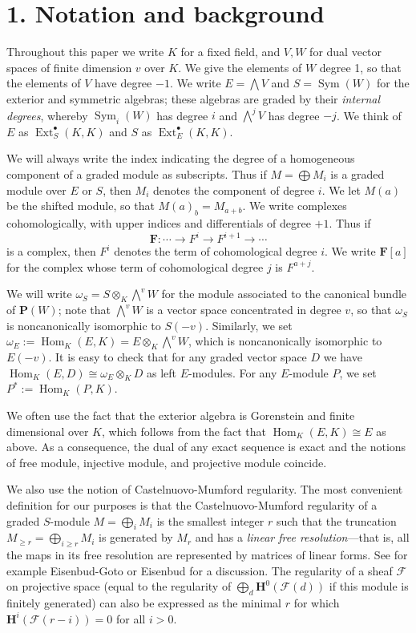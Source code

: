 \documentclass{tran-l}
\newcommand{\iso}{\cong}
\newcommand{\myHom}{\operatorname{Hom}}
\newcommand{\Ext}{{\operatorname{Ext}}}
\newcommand{\Sym}{\operatorname{Sym}}
\newcommand{\F}{\mathcal{F}}
\newcommand{\FF}{\mathbf{F}}
\newcommand{\myH}{\mathbf{H}}
\newcommand{\myP}{\mathbf{P}}
\theoremstyle{plain}
\theoremstyle{remark}
\theoremstyle{definition}
\begin{document}
\section*{1. Notation and background}

Throughout this paper we write $K$ for a fixed field, and $V, W$ for
dual vector spaces of finite dimension $v$ over $K$.  We give the
elements of $W$ degree 1, so that the elements of $V$ have degree
$-1$.  We write $E=\bigwedge V$ and $S=\Sym (W)$ for the exterior and
symmetric algebras; these algebras are graded by their {\em internal
degrees\/}, whereby $\Sym _{i}(W)$ has degree $i$ and $\bigwedge ^{j}V$ has
degree $-j$.  We think of $E$ as $\Ext _{S}^{\bullet }(K,K)$ and $S$ as
$\Ext _{E}^{\bullet }(K,K)$.

We will always write the index indicating the degree of
a homogeneous component of
a graded module as subscripts. Thus if $M=\bigoplus M_{i}$ is a graded module over
$E$ or $S$, then $M_{i}$ denotes the component of degree $i$.
We let $M(a)$ be the shifted module, so that
$M(a)_{b}=M_{a+b}$.
We write complexes cohomologically, with
upper indices and differentials of degree $+1$. Thus if
\begin{equation*}\FF : \cdots \to F^{i}\to F^{i+1}\to \cdots
\end{equation*}
is a complex,
then $F^{i}$ denotes the term of cohomological degree $i$.
We write $\FF [a]$ for the complex whose
term of cohomological degree $j$ is $F^{a+j}$.

We will write
$\omega _{S}=S\otimes _{K}\bigwedge ^{v}W$
for the module associated to the canonical bundle of $\myP (W)$;
note that $\bigwedge ^{v}W$ is a vector space concentrated in
degree $v$, so that $\omega _{S}$ is noncanonically isomorphic
to $S(-v)$. Similarly, we set
$\omega _{E}:=\myHom _{K}(E,K)=E\otimes _{K}\bigwedge ^{v}W$, which is
noncanonically isomorphic to $E(-v)$.
It is easy to check that for any graded vector space $D$ we have
$\myHom _{K}(E,D)\cong \omega _{E}\otimes _{K} D$
as left $E$-modules.
For any $E$-module $P$, we set $P^{*}:=\myHom _{K}(P,K)$.

We often use the fact that the exterior algebra is Gorenstein and
finite dimensional over $K$,
which follows from the fact that $\myHom _{K}(E,K)\iso E$ as above.
As a consequence, the dual of any exact sequence is exact and the notions of
free module, injective module, and projective module coincide.

We also use the notion of Castelnuovo-Mumford regularity.
The most convenient
definition for our purposes is that the Castelnuovo-Mumford
regularity of a graded $S$-module $M=\bigoplus _{i}M_{i}$ is the smallest integer
$r$ such that the truncation $M_{\geq r}=\bigoplus _{i\geq r}M_{i}$
is generated by $M_{r}$ and has
a {\em linear free resolution}---that is, all the maps in
its free resolution are represented by matrices of linear forms.
See for example
Eisenbud-Goto \cite{EG} or Eisenbud \cite{Eis}
for a discussion. The regularity of a sheaf $\F $ on projective space
(equal to the regularity of $\bigoplus _{d} \myH ^{0}(\F (d))$ if this module
is finitely generated) can also be expressed as the minimal
$r$ for which $\myH ^{i}(\F (r-i))=0$ for all $i>0$.
\end{document}
